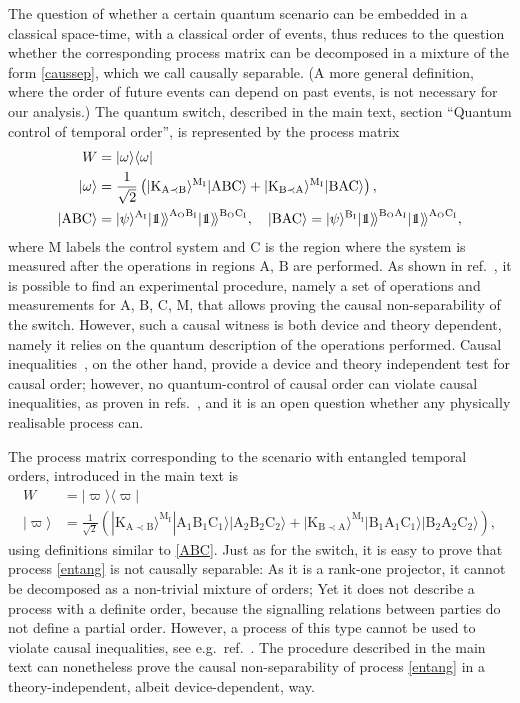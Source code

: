 \documentclass[a4paper,11pt]{article}
\newcommand\id{\leavevmode\hbox{\small1\kern-3.3pt\normalsize1}}
\newcommand{\Ket}[1]{{ \vert {#1}  \rangle \!  \rangle}}
\newcommand{\bra}{\langle}
\newcommand{\ket}{\rangle}
\begin{document}
The question of whether a certain quantum scenario can be embedded in a classical space-time, with a classical order of events, thus reduces to the question whether the corresponding process matrix can be decomposed in a mixture of the form \eqref{caussep}, which we call causally separable. (A more general definition, where the order of future events can depend on past events, is not necessary for our analysis.) The quantum switch, described in the main text, section ``Quantum control of temporal order'', is represented by the process matrix
\begin{align} \label{switch}
W&=|\omega\ket\bra \omega | \\
|\omega\ket &= \frac{1}{\sqrt{2}}\left(|\mathrm{K_{A\prec B}}\ket^\mathrm{M_I}|\mathrm{ABC} \ket + |\mathrm{K_{B\prec A}}\ket^\mathrm{M_I}|\mathrm{BAC} \ket\right), \\ \label{ABC}
|\mathrm{ABC} \ket &= |\psi\ket^\mathrm{A_I}\Ket{\id}^\mathrm{A_OB_I}\Ket{\id}^\mathrm{B_OC_I}, \quad
|\mathrm{BAC} \ket = |\psi\ket^\mathrm{B_I}\Ket{\id}^\mathrm{B_OA_I}\Ket{\id}^\mathrm{A_OC_I},
\end{align}
where $\mathrm{M}$ labels the control system and $\mathrm C$ is the region where the system is measured after the operations in regions $\mathrm A$, $\mathrm B$ are performed.
As shown in ref.~\cite{araujo15}, it is possible to find an experimental procedure, namely a set of operations and measurements for $\mathrm A$, $\mathrm B$, $\mathrm C$, $\mathrm M$, that allows proving the causal non-separability of the switch. However, such a causal witness is both device and theory dependent, namely it relies on the quantum description of the operations performed. Causal inequalities~\cite{Oreshkov:2012, branciard16}, on the other hand, provide a device and theory independent test for causal order; however, no quantum-control of causal order can violate causal inequalities, as proven in refs.~\cite{araujo15, Oreshkov2015},
 and it is an open question whether any physically realisable process can.

The process matrix corresponding to the scenario with entangled temporal orders, introduced in the main text is
\begin{align} \label{entang}
W&=|\varpi\ket\bra \varpi | \\
|\varpi\ket &= \frac{1}{\sqrt{2}}\left(|\mathrm{K_{A\prec B}}\ket^\mathrm{M_I}|\mathrm{A_1B_1C_1} \ket|\mathrm{A_2B_2C_2} \ket + |\mathrm{K_{B\prec A}}\ket^\mathrm{M_I}|\mathrm{B_1A_1C_1} \ket |\mathrm{B_2A_2C_2} \ket\right),
\end{align}
using definitions similar to \eqref{ABC}. Just as for the switch, it is easy to prove that process \eqref{entang} is not causally separable: As it is a rank-one projector, it cannot be decomposed as a non-trivial mixture of orders; Yet it does not describe a process with a definite order, because the signalling relations between parties do not define a partial order. However,   a process of this type cannot be used to violate causal inequalities, see e.g.~ref.~\cite{araujo15}.
The procedure described in the main text can nonetheless prove the causal non-separability of process \eqref{entang} in a theory-independent, albeit device-dependent, way.
\end{document}
